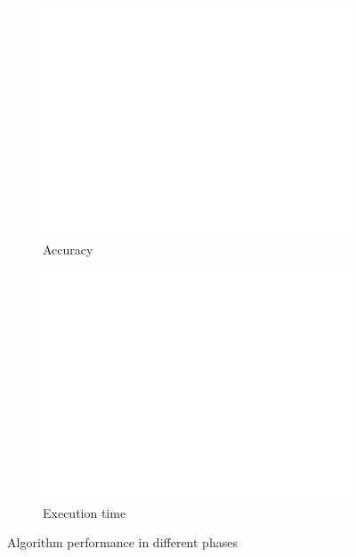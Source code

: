 \documentclass[conference,onecolumn]{IEEEtran}
\begin{document}
    \begin{figure}[H]
        \centering
        
        \begin{subfigure}{0.45\textwidth}
            \centering
            \includegraphics[width=\linewidth]{Plots/AccuracyofAlgorithmsinDifferentPhases.png}
            \caption{Accuracy}
            \label{fig:accuracyOfAlgorithmsInDifferentphases}
        \end{subfigure}
        \hfill
        \begin{subfigure}{0.45\textwidth}
            \centering
            \includegraphics[width=\linewidth]{Plots/ExecutionTimeofAlgorithmsinDifferentPhases.png}
            \caption{Execution time}
            \label{fig:executionTimeOfAlgorithmsInDifferentphases}
        \end{subfigure}
        
        \caption{Algorithm performance in different phases}
    \end{figure}
\end{document}
